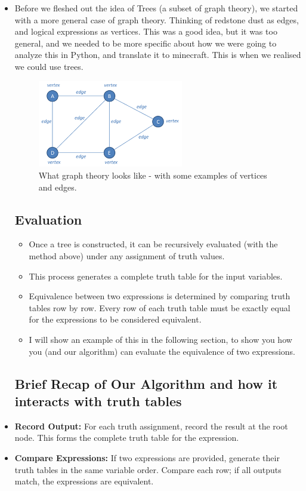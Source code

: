 \documentclass[11pt]{diazessay} %
\begin{document}
\begin{itemize}
\item Before we fleshed out the idea of Trees (a subset of graph theory), we started with a more general case of graph theory. Thinking of redstone dust as edges, and logical expressions as vertices. This was a good idea, but it was too general, and we needed to be more specific about how we were going to analyze this in Python, and translate it to minecraft. This is when we realised we could use trees.
    \begin{figure}[h]
        \centering
        \includegraphics[width=0.6\textwidth]{gt.png}
        \caption{What graph theory looks like - with some examples of vertices and edges.}
        \label{fig:graph_theory_example}
    \end{figure}

\subsection*{Evaluation}
\begin{itemize}
    \item Once a tree is constructed, it can be recursively evaluated (with the method above) under any 
    assignment of truth values. 
    \item This process generates a complete truth table for the input variables.
    \item Equivalence between two expressions is determined by comparing truth 
    tables row by row. Every row of each truth table must be exactly equal for the expressions to be considered equivalent.
	\item I will show an example of this in the following section, to show you how you (and our algorithm) can evaluate the equivalence of two expressions.
\end{itemize}

\subsection{Brief Recap of Our Algorithm and how it interacts with truth tables}
\item \textbf{Record Output:} For each truth assignment, record the result at the root node. This forms the complete truth table for the expression.
    \item \textbf{Compare Expressions:} If two expressions are provided, generate their truth tables in the same variable order. Compare each row; if all outputs match, the expressions are equivalent.


\end{itemize}
\end{document}
